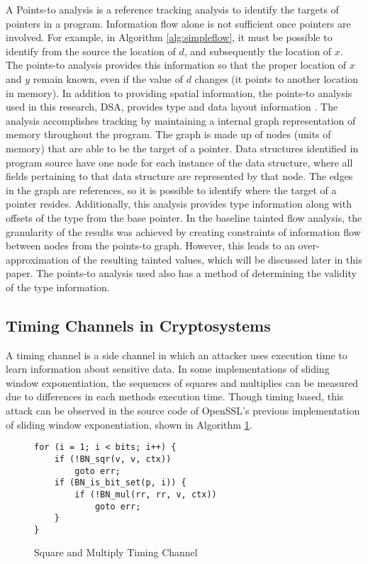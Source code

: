 A Points-to analysis is a reference tracking analysis to identify the targets of
pointers in a program. Information flow alone is not sufficient once pointers are
involved. For example, in Algorithm \ref{alg:simpleflow}, it must be possible to
identify from the source the location of $d$, and subsequently the location of
$x$. The points-to analysis provides this information so that the proper
location of $x$ and $y$ remain known, even if the value of $d$ changes
(it points to another location in memory). In addition to providing spatial
information, the points-to analysis used in this research, DSA, provides type and data
layout information \cite{DSA-lattner}. The analysis accomplishes tracking by maintaining a internal
graph representation of memory throughout the program. The graph is made up of
nodes (units of memory) that are able to be the target of a pointer.
Data structures identified in program source have one node for each instance of
the data structure, where all fields pertaining to that data structure are
represented by that node. The edges in the graph are references, so it is
possible to identify where the target of a pointer resides. Additionally, this
analysis provides type information along with offsets of the type from the base
pointer. In the baseline tainted flow analysis, the granularity of the results
was achieved by creating  constraints of information flow between nodes from the
points-to graph. However, this leads to an over-approximation of the resulting
tainted values, which will be discussed later in this paper. The points-to analysis
used also has a method of determining the validity of the type information.

\subsection{Timing Channels in Cryptosystems}

A timing channel is a side channel in which an attacker uses execution time to
learn information about sensitive data. In some implementations of sliding
window exponentiation, the sequences of squares and multiplies can be measured
due to differences in each methods execution time. Though timing
based, this attack can be observed in the source code of OpenSSL's previous
implementation of sliding window exponentiation, shown in Algorithm
\ref{alg:timingsqrmlt}.

\begin{figure}
\begin{lstlisting}
for (i = 1; i < bits; i++) {
    if (!BN_sqr(v, v, ctx))
        goto err;
    if (BN_is_bit_set(p, i)) {
        if (!BN_mul(rr, rr, v, ctx))
            goto err;
    }
}
\end{lstlisting}
\caption{Square and Multiply Timing Channel}
\label{alg:timingsqrmlt}
\end{figure}

